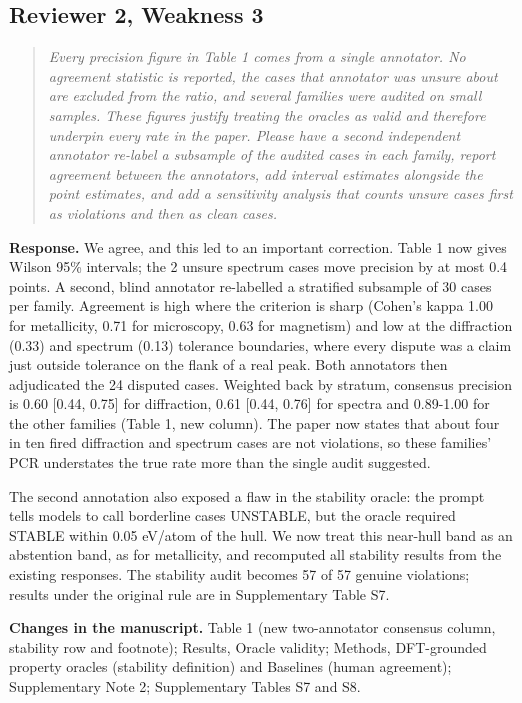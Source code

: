 \documentclass[11pt,a4paper]{article}
\newenvironment{reviewer}{\begin{quote}\itshape\small}{\end{quote}}
\begin{document}
\subsection*{Reviewer 2, Weakness 3}

\begin{reviewer}Every precision figure in Table 1 comes from a single annotator. No agreement statistic is reported, the cases that annotator was unsure about are excluded from the ratio, and several families were audited on small samples. These figures justify treating the oracles as valid and therefore underpin every rate in the paper. Please have a second independent annotator re-label a subsample of the audited cases in each family, report agreement between the annotators, add interval estimates alongside the point estimates, and add a sensitivity analysis that counts unsure cases first as violations and then as clean cases.\end{reviewer}

\textbf{Response.} We agree, and this led to an important correction. Table 1 now gives Wilson 95\% intervals; the 2 unsure spectrum cases move precision by at most 0.4 points. A second, blind annotator re-labelled a stratified subsample of 30 cases per family. Agreement is high where the criterion is sharp (Cohen's kappa 1.00 for metallicity, 0.71 for microscopy, 0.63 for magnetism) and low at the diffraction (0.33) and spectrum (0.13) tolerance boundaries, where every dispute was a claim just outside tolerance on the flank of a real peak. Both annotators then adjudicated the 24 disputed cases. Weighted back by stratum, consensus precision is 0.60 [0.44, 0.75] for diffraction, 0.61 [0.44, 0.76] for spectra and 0.89-1.00 for the other families (Table 1, new column). The paper now states that about four in ten fired diffraction and spectrum cases are not violations, so these families' PCR understates the true rate more than the single audit suggested.

The second annotation also exposed a flaw in the stability oracle: the prompt tells models to call borderline cases UNSTABLE, but the oracle required STABLE within 0.05 eV/atom of the hull. We now treat this near-hull band as an abstention band, as for metallicity, and recomputed all stability results from the existing responses. The stability audit becomes 57 of 57 genuine violations; results under the original rule are in Supplementary Table S7.

\textbf{Changes in the manuscript.} Table 1 (new two-annotator consensus column, stability row and footnote); Results, Oracle validity; Methods, DFT-grounded property oracles (stability definition) and Baselines (human agreement); Supplementary Note 2; Supplementary Tables S7 and S8.
\end{document}
